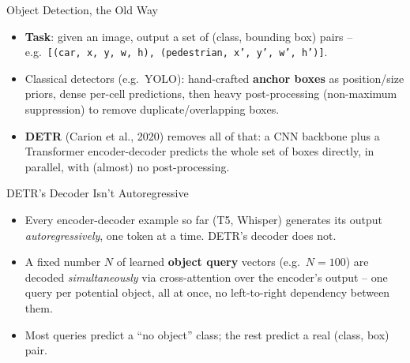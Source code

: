 \begin{vbframe}{Object Detection, the Old Way}
\begin{itemize}
  \item \textbf{Task}: given an image, output a set of (class, bounding box) pairs -- e.g.\ \texttt{[(car, x, y, w, h), (pedestrian, x', y', w', h')]}.
  \item Classical detectors (e.g.\ YOLO): hand-crafted \textbf{anchor boxes} as position/size priors, dense per-cell predictions, then heavy post-processing (non-maximum suppression) to remove duplicate/overlapping boxes.
  \item \textbf{DETR} (Carion et al., 2020) removes all of that: a CNN backbone plus a Transformer encoder-decoder predicts the whole set of boxes directly, in parallel, with (almost) no post-processing.
\end{itemize}
\end{vbframe}

\begin{vbframe}{DETR's Decoder Isn't Autoregressive}
\begin{itemize}
  \item Every encoder-decoder example so far (T5, Whisper) generates its output \emph{autoregressively}, one token at a time. DETR's decoder does not.
\end{itemize}

\begin{center}
\end{center}

\begin{itemize}
  \item A fixed number $N$ of learned \textbf{object query} vectors (e.g.\ $N=100$) are decoded \emph{simultaneously} via cross-attention over the encoder's output -- one query per potential object, all at once, no left-to-right dependency between them.
  \item Most queries predict a ``no object'' class; the rest predict a real (class, box) pair.
\end{itemize}
\end{vbframe}

